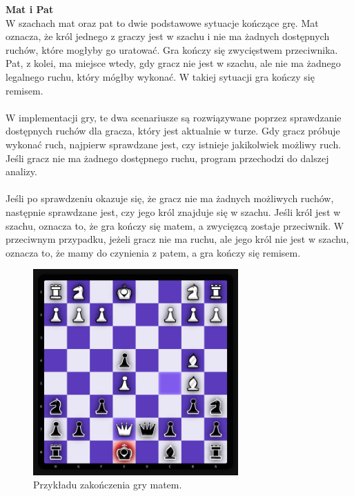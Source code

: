 \documentclass[12pt,a4paper]{article}
\begin{document}
\newpage

\noindent \textbf{Mat i Pat}\\
W szachach mat oraz pat to dwie podstawowe sytuacje kończące grę. Mat oznacza, że król jednego z graczy jest w szachu i nie ma żadnych dostępnych ruchów, które mogłyby go uratować. Gra kończy się zwycięstwem przeciwnika. Pat, z kolei, ma miejsce wtedy, gdy gracz nie jest w szachu, ale nie ma żadnego legalnego ruchu, który mógłby wykonać. W takiej sytuacji gra kończy się remisem.
\\\\
W implementacji gry, te dwa scenariusze są rozwiązywane poprzez sprawdzanie dostępnych ruchów dla gracza, który jest aktualnie w turze. Gdy gracz próbuje wykonać ruch, najpierw sprawdzane jest, czy istnieje jakikolwiek możliwy ruch. Jeśli gracz nie ma żadnego dostępnego ruchu, program przechodzi do dalszej analizy.
\\\\
Jeśli po sprawdzeniu okazuje się, że gracz nie ma żadnych możliwych ruchów, następnie sprawdzane jest, czy jego król znajduje się w szachu. Jeśli król jest w szachu, oznacza to, że gra kończy się matem, a zwycięzcą zostaje przeciwnik. W przeciwnym przypadku, jeżeli gracz nie ma ruchu, ale jego król nie jest w szachu, oznacza to, że mamy do czynienia z patem, a gra kończy się remisem.

\vspace{0.5cm}
\begin{figure}[h!]
    \centering
    \includegraphics[width=0.7\textwidth]{images/imp_front_checkmate.png}
    \caption{Przykładu zakończenia gry matem.}
\end{figure}
\vspace{0.5cm}
\end{document}
